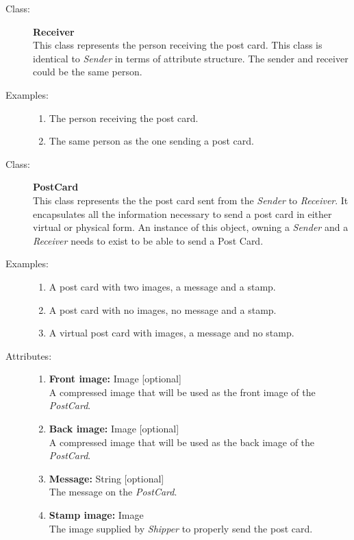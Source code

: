 \documentclass[10pt,a4paper]{article}
\begin{document}
\hrulefill

\begin{description}
\item[Class:] \textbf{Receiver} \hfill \\
This class represents the person receiving the post card. This class is identical to \textit{Sender} in terms of attribute structure. The sender and receiver could be the same person.

\item[Examples:] \hfill
\begin{enumerate}
\item The person receiving the post card.
\item The same person as the one sending a post card.
\end{enumerate}
\end{description}

\hrulefill

\begin{description}
\item[Class:] \textbf{PostCard} \hfill \\
This class represents the the post card sent from the \textit{Sender} to \textit{Receiver}. It encapsulates all the information necessary to send a post card in either virtual or physical form. An instance of this object, owning a \textit{Sender} and a \textit{Receiver} needs to exist to be able to send a Post Card. 

\item[Examples:] \hfill
\begin{enumerate}
\item A post card with two images, a message and a stamp.
\item A post card with no images, no message and a stamp.
\item A virtual post card with images, a message and no stamp.
\end{enumerate}

\item[Attributes:] \hfill
\begin{enumerate}
\item \textbf{Front image:} Image [optional] \hfill \\A compressed image that will be used as the front image of the \textit{PostCard}. 
\item \textbf{Back image:} Image [optional] \hfill \\A compressed image that will be used as the back image of the \textit{PostCard}.
\item \textbf{Message:} String [optional] \hfill \\The message on the \textit{PostCard}.
\item \textbf{Stamp image:} Image \hfill \\The image supplied by \textit{Shipper} to properly send the post card.
\end{enumerate}
\end{description}
\end{document}

